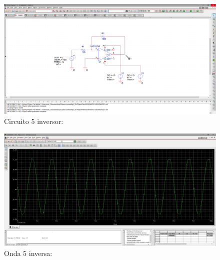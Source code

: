 \documentclass[letterpaper]{article}
\begin{document}
\begin{figure}[htbp]
    \centering
    \includegraphics[width=18cm]{IMG/cir(1).png}
    \caption{Circuito 5 inversor:}
    \label{fig:my_label}
\end{figure}
\begin{figure}[htbp]
    \centering
    \includegraphics[width=18cm]{IMG/ond(4).png}
    \caption{Onda 5 inversa: }
    \label{fig:my_label}
\end{figure}
\end{document}
